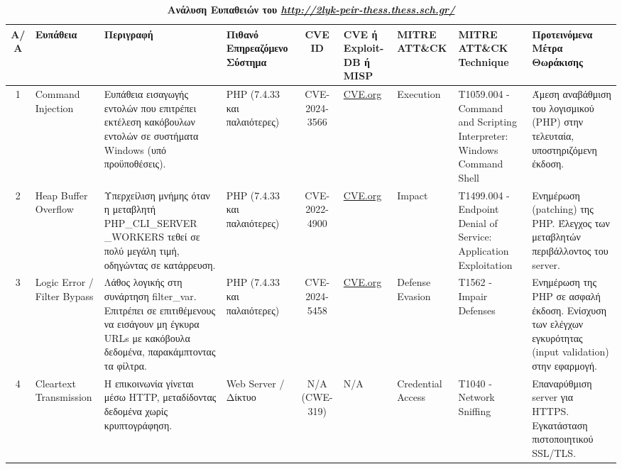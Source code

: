 \documentclass[12pt, a4paper]{article}
\begin{document}
\begin{landscape}
\begin{table}[ht]
\caption{\textbf{Ανάλυση Ευπαθειών του \textit{\href{http://2lyk-peir-thess.thess.sch.gr/}{http://2lyk-peir-thess.thess.sch.gr/}}}}
\label{tab:1}
\centering
\small
\renewcommand{\arraystretch}{1.5}
\begin{tabularx}{\linewidth}{|c|p{2.2cm}|X|p{2cm}|c|p{2.2cm}|p{2cm}|p{3.5cm}|X|}
\hline
\rowcolor{tablehead}
\textbf{Α/Α} & \textbf{Ευπάθεια} & \textbf{Περιγραφή} & \textbf{Πιθανό Επηρεαζόμενο Σύστημα} & \textbf{CVE ID} & \textbf{CVE ή Exploit-DB ή MISP} & \textbf{MITRE ATT\&CK} & \textbf{MITRE ATT\&CK Technique} & \textbf{Προτεινόμενα Μέτρα Θωράκισης} \\
\hline
1 & Command Injection & Ευπάθεια εισαγωγής εντολών που επιτρέπει εκτέλεση κακόβουλων εντολών σε συστήματα Windows (υπό προϋποθέσεις). & PHP (7.4.33 και παλαιότερες) & CVE-2024-3566 & \href{https://www.cve.org/CVERecord?id=CVE-2024-3566}{CVE.org} & Execution & T1059.004 - Command and Scripting Interpreter: Windows Command Shell & Άμεση αναβάθμιση του λογισμικού (PHP) στην τελευταία, υποστηριζόμενη έκδοση. \\
\hline
2 & Heap Buffer Overflow & Υπερχείλιση μνήμης όταν η μεταβλητή PHP\_CLI\_SERVER \_WORKERS τεθεί σε πολύ μεγάλη τιμή, οδηγώντας σε κατάρρευση. & PHP (7.4.33 και παλαιότερες) & CVE-2022-4900 & \href{https://www.cve.org/CVERecord?id=CVE-2022-4900}{CVE.org} & Impact & T1499.004 - Endpoint Denial of Service: Application Exploitation & Ενημέρωση (patching) της PHP. Έλεγχος των μεταβλητών περιβάλλοντος του server. \\
\hline
3 & Logic Error / Filter Bypass & Λάθος λογικής στη συνάρτηση filter\_var. Επιτρέπει σε επιτιθέμενους να εισάγουν μη έγκυρα URLs με κακόβουλα δεδομένα, παρακάμπτοντας τα φίλτρα. & PHP (7.4.33 και παλαιότερες) & CVE-2024-5458 & \href{https://www.cve.org/CVERecord?id=CVE-2024-5458}{CVE.org} & Defense Evasion & T1562 - Impair Defenses & Ενημέρωση της PHP σε ασφαλή έκδοση. Ενίσχυση των ελέγχων εγκυρότητας (input validation) στην εφαρμογή. \\
\hline
4 & Cleartext Transmission & Η επικοινωνία γίνεται μέσω HTTP, μεταδίδοντας δεδομένα χωρίς κρυπτογράφηση. & Web Server / Δίκτυο & N/A (CWE-319) & N/A & Credential Access & T1040 - Network Sniffing & Επαναρύθμιση server για HTTPS. Εγκατάσταση πιστοποιητικού SSL/TLS. \\
\hline
\end{tabularx}
\end{table}


\end{landscape}
\end{document}
